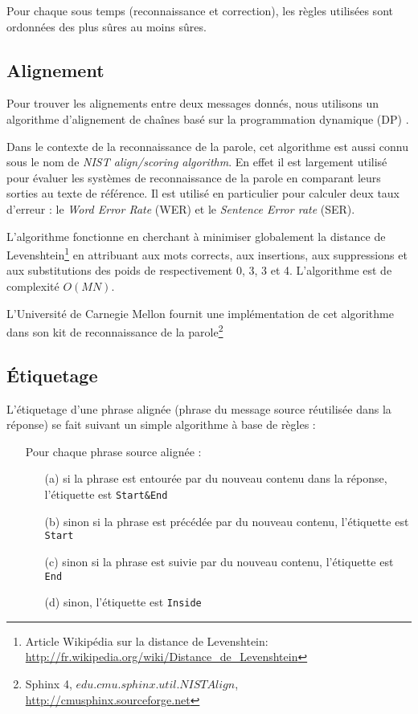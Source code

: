 Pour chaque sous temps (reconnaissance et correction), les règles utilisées sont ordonnées des plus sûres au moins sûres.

\subsection{Alignement}

\label{subsec:alignment}

Pour trouver les alignements entre deux messages donnés, nous utilisons un algorithme d'alignement de chaînes basé sur la programmation dynamique (DP) \cite{sankoff:1983}. 

Dans le contexte de la reconnaissance de la parole, cet algorithme est aussi connu sous le nom de \textit{NIST align/scoring algorithm}. En effet il est largement utilisé pour évaluer les systèmes de reconnaissance de la parole en comparant leurs sorties au texte de référence. Il est utilisé en particulier pour calculer deux taux d'erreur : le \textit{Word Error Rate} (WER) et le \textit{Sentence Error rate} (SER).

L'algorithme fonctionne en cherchant à minimiser globalement la distance de Levenshtein\footnote{Article Wikipédia sur la distance de Levenshtein: \url{http://fr.wikipedia.org/wiki/Distance_de_Levenshtein}} \cite{levenshtein1966binary} en attribuant aux mots corrects, aux insertions, aux suppressions et aux substitutions des poids de respectivement 0, 3, 3 et 4. L'algorithme est de complexité $O(MN)$.

L'Université de Carnegie Mellon fournit une implémentation de cet algorithme dans son kit de reconnaissance de la parole\footnote{Sphinx 4, $edu.cmu.sphinx.util.NISTAlign$, \url{http://cmusphinx.sourceforge.net}}

\subsection{Étiquetage}

\label{subsec:labelling}

L'étiquetage d'une phrase alignée (phrase du message source réutilisée dans la réponse) se fait suivant un simple algorithme à base de règles :

\begin{itemize}
    \item[] Pour chaque phrase source alignée :
    \begin{itemize}
        \item[(a)] si la phrase est entourée par du nouveau contenu dans la réponse, l'étiquette est \texttt{Start\&End}
        \item[(b)] sinon si la phrase est précédée par du nouveau contenu, l'étiquette est \texttt{Start}
        \item[(c)] sinon si la phrase est suivie par du nouveau contenu, l'étiquette est \texttt{End}
        \item[(d)] sinon, l'étiquette est \texttt{Inside}
    \end{itemize}
\end{itemize}